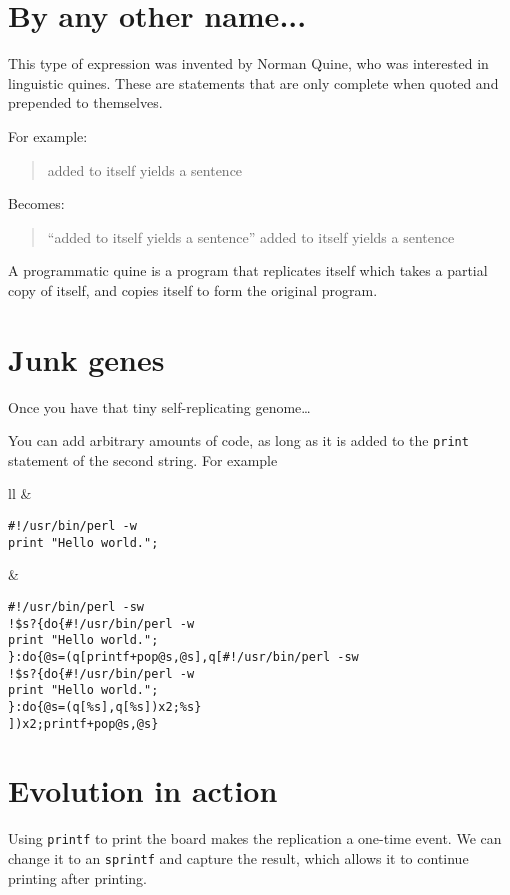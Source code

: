 \documentclass{article}
\begin{document}
\section{By any other name...}
This type of expression was invented by Norman Quine, who was interested
in linguistic quines.  These are statements that are only complete when
quoted and prepended to themselves.

For example:
\begin{quote}
added to itself yields a sentence
\end{quote}

Becomes:
\begin{quote}
``added to itself yields a sentence''
added to itself yields a sentence
\end{quote}

A programmatic quine is a program that replicates itself which takes a
partial copy of itself, and copies itself to form the original program.

\section{Junk genes}
Once you have that tiny self-replicating genome\ldots

You can add arbitrary amounts of code, as long as it is added to the
\verb"print" statement of the second string.  For example

\noindent\begin{tabular}{ll}
 & \\
\begin{minipage}[t]{1.75in}
\begin{verbatim}
#!/usr/bin/perl -w
print "Hello world.";
\end{verbatim}
\end{minipage}
&
\begin{minipage}[t]{2in}
\begin{verbatim}
#!/usr/bin/perl -sw
!$s?{do{#!/usr/bin/perl -w
print "Hello world.";
}:do{@s=(q[printf+pop@s,@s],q[#!/usr/bin/perl -sw
!$s?{do{#!/usr/bin/perl -w
print "Hello world.";
}:do{@s=(q[%s],q[%s])x2;%s}
])x2;printf+pop@s,@s}
\end{verbatim}
\end{minipage}
\end{tabular}

\section{Evolution in action}
Using \verb"printf" to print the board makes the replication a one-time 
event.  We can change it to an
\verb"sprintf" and capture the result, which allows it to continue
printing after printing.
\end{document}
